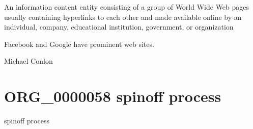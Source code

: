 \documentclass[letterpaper,10pt,english]{sphinxmanual}
\begin{document}
\begin{sphinxShadowBox}

\sphinxAtStartPar
An information content entity consisting of a group of World Wide Web pages usually containing hyperlinks to each other and made available online by an individual, company, educational institution, government, or organization
\end{sphinxShadowBox}

\begin{sphinxShadowBox}

\sphinxAtStartPar
{}
\end{sphinxShadowBox}

\begin{sphinxShadowBox}

\sphinxAtStartPar
Facebook and Google have prominent web sites.
\end{sphinxShadowBox}

\begin{sphinxShadowBox}

\sphinxAtStartPar
{}
\end{sphinxShadowBox}

\begin{sphinxShadowBox}

\sphinxAtStartPar
Michael Conlon 
\end{sphinxShadowBox}
\begin{quote}
\label{\detokenize{doc-ORG_0000058:org-0000058}}\label{\detokenize{doc-ORG_0000058:spin-off-process}}\label{\detokenize{doc-ORG_0000058:org-0000058}}
\ignorespaces \end{quote}


\section{ORG\_0000058 \sphinxhyphen{} spin\sphinxhyphen{}off process}
\label{\detokenize{doc-ORG_0000058:org-0000058-spin-off-process}}\label{\detokenize{doc-ORG_0000058:index-0}}\label{\detokenize{doc-ORG_0000058::doc}}
\begin{sphinxShadowBox}

\sphinxAtStartPar
spin\sphinxhyphen{}off process
\end{sphinxShadowBox}
\end{document}
